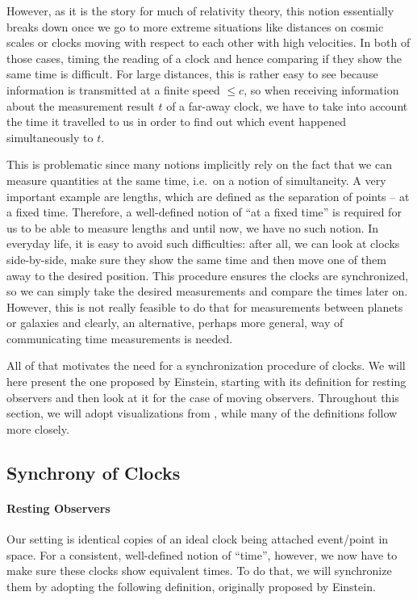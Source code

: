 However, as it is the story for much of relativity theory, this notion essentially breaks down once we go to more extreme situations like distances on cosmic scales or clocks moving with respect to each other with high velocities. In both of those cases, timing the reading of a clock and hence comparing if they show the same time is difficult. For large distances, this is rather easy to see because information is transmitted at a finite speed $\leq c$, so when receiving information about the measurement result $t$ of a far-away clock, we have to take into account the time it travelled to us in order to find out which event happened simultaneously to $t$.

This is problematic since many notions implicitly rely on the fact that we can measure quantities at the same time, i.e.~on a notion of simultaneity. A very important example are lengths, which are defined as the separation of points -- at a fixed time. Therefore, a well-defined notion of \enquote{at a fixed time} is required for us to be able to measure lengths and until now, we have no such notion. In everyday life, it is easy to avoid such difficulties: after all, we can look at clocks side-by-side, make sure they show the same time and then move one of them away to the desired position. This procedure ensures the clocks are synchronized, so we can simply take the desired measurements and compare the times later on. However, this is not really feasible to do that for measurements between planets or galaxies and clearly, an alternative, perhaps more general, way of communicating time measurements is needed.


All of that motivates the need for a synchronization procedure of clocks. We will here present the one proposed by Einstein, starting with its definition for resting observers and then look at it for the case of moving observers. Throughout this section, we will adopt visualizations from \cite{dragon_geometry_srt}, while many of the definitions follow \cite{giulini_srt} more closely.



		\subsection{Synchrony of Clocks}
			\paragraph{Resting Observers}
Our setting is identical copies of an ideal clock being attached event/point in space. For a consistent, well-defined notion of \enquote{time}, however, we now have to make sure these clocks show equivalent times. To do that, we will synchronize them by adopting the following definition, originally proposed by Einstein.


